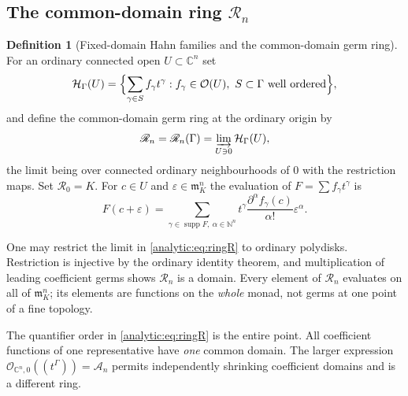 \documentclass[11pt,letterpaper]{article}
\theoremstyle{definition}
\newtheorem{definition}[theorem]{Definition}
\theoremstyle{remark}
\newcommand{\C}{\mathbb C}
\newcommand{\N}{\mathbb N}
\newcommand{\A}{\mathscr A}
\newcommand{\RR}{\mathscr R}
\newcommand{\HH}{\mathcal H}
\newcommand{\m}{\mathfrak m}
\newcommand{\OO}{\mathcal O}
\newcommand{\supp}{\operatorname{supp}}
\numberwithin{equation}{section}
\begin{document}
\subsection{The common-domain ring $\RR_n$}\label{analytic:subsec:ringR}
\begin{definition}[Fixed-domain Hahn families and the common-domain germ
ring]\label{analytic:def:ringR}
For an ordinary connected open $U\subset\C^n$ set
\[
 \HH_\Gamma(U)=\Bigl\{\sum_{\gamma\in S}f_\gamma t^\gamma:
 f_\gamma\in\OO(U),\ S\subset\Gamma\ \text{well ordered}\Bigr\},
\]
and define the common-domain germ ring at the ordinary origin by
\begin{equation}\label{analytic:eq:ringR}
 \RR_n=\RR_n(\Gamma)=\varinjlim_{U\ni0}\HH_\Gamma(U),
\end{equation}
the limit being over connected ordinary neighbourhoods of $0$ with the
restriction maps. Set $\RR_0=K$. For $c\in U$ and $\varepsilon\in\m_K^n$ the
evaluation of $F=\sum f_\gamma t^\gamma$ is
\begin{equation}\label{analytic:eq:evaluationR}
 F(c+\varepsilon)=\sum_{\gamma\in\supp F,\ \alpha\in\N^n}
 t^\gamma\frac{\partial^\alpha f_\gamma(c)}{\alpha!}\varepsilon^\alpha .
\end{equation}
\end{definition}

One may restrict the limit in \eqref{analytic:eq:ringR} to ordinary
polydisks. Restriction is injective by the ordinary identity theorem, and
multiplication of leading coefficient germs shows $\RR_n$ is a domain. Every
element of $\RR_n$ evaluates on all of $\m_K^n$; its elements are functions
on the \emph{whole} monad, not germs at one point of a fine topology.

The quantifier order in \eqref{analytic:eq:ringR} is the entire point. All
coefficient functions of one representative have \emph{one} common domain.
The larger expression $\OO_{\C^n,0}((t^\Gamma))=\A_n$ permits independently
shrinking coefficient domains and is a different ring.
\end{document}
